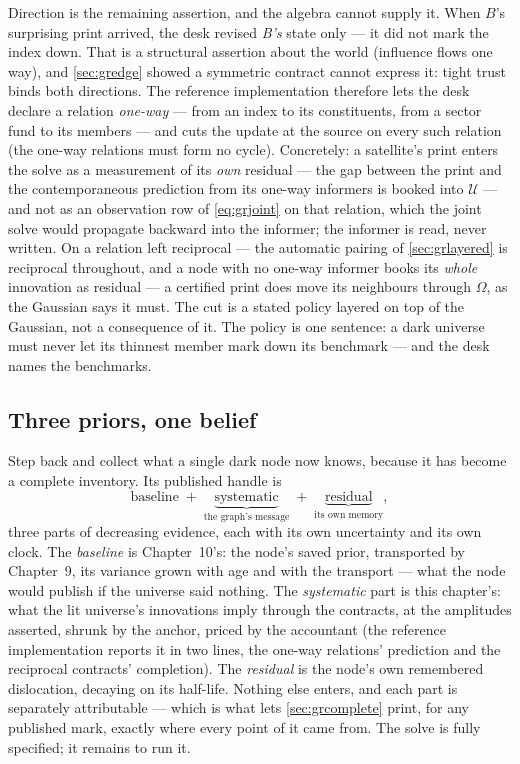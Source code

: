 Direction is the remaining assertion, and the algebra cannot supply
it.  When $B$'s surprising print
arrived, the desk revised \emph{B's} state only --- it did not mark
the index down.  That is a structural assertion about the world
(influence flows one way), and \cref{sec:gredge} showed a symmetric
contract cannot express it: tight trust binds both directions.  The
reference implementation therefore lets the desk declare a relation
\emph{one-way} --- from an index to its constituents, from a sector
fund to its members --- and cuts the update at the source on every
such relation (the one-way relations must form no cycle).
Concretely: a satellite's print enters the solve as a measurement
of its \emph{own} residual --- the gap between the print and the
contemporaneous prediction from its one-way informers is booked into
$\mathcal{U}$ --- and not as an observation row of \cref{eq:grjoint}
on that relation, which the joint solve would propagate backward
into the informer; the informer is read, never written.  On a
relation left reciprocal --- the automatic pairing of
\cref{sec:grlayered} is reciprocal throughout, and a node with no
one-way informer books its \emph{whole} innovation as residual ---
a certified print does move its neighbours through $\Omega$, as the
Gaussian says it must.  The cut
is a stated policy layered on top of the Gaussian, not a
consequence of it.  The policy is one sentence: a
dark universe must never let its thinnest member mark down its
benchmark --- and the desk names the benchmarks.

\subsection{Three priors, one belief}

Step back and collect what a single dark node now knows, because it
has become a complete inventory.  Its published handle is
\[
\text{baseline}
\;+\;
\underbrace{\text{systematic}}_{\text{the graph's message}}
\;+\;
\underbrace{\text{residual}}_{\text{its own memory}},
\]
three parts of decreasing evidence, each with its own uncertainty and
its own clock.  The \emph{baseline} is Chapter~10's: the node's saved
prior, transported by Chapter~9, its variance grown with age and
with the transport --- what the node would publish if the universe said
nothing.  The \emph{systematic} part is this chapter's: what the lit
universe's innovations imply through the contracts, at the amplitudes
asserted, shrunk by the anchor, priced by the accountant (the
reference implementation reports it in two lines, the one-way
relations' prediction and the reciprocal contracts' completion).  The
\emph{residual} is the node's own remembered dislocation, decaying on
its half-life.  Nothing else enters, and each part is separately
attributable --- which is what lets \cref{sec:grcomplete}
print, for any published mark, exactly where every point of it came
from.  The solve is fully specified; it remains to run it.
